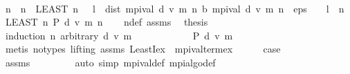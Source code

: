\begin{isabellebody}
%
\isadelimproof
%
\endisadelimproof
%
\isatagproof
{}\isamarkupfalse%
\ {\isacharminus}{\kern0pt}\isanewline
\ \ \isamarkupfalse%
\ n\ \ {\isachardoublequoteopen}n\ {\isacharequal}{\kern0pt}\ {\isacharparenleft}{\kern0pt}LEAST\ n{\isachardot}{\kern0pt}\ {}\ {\isacharasterisk}{\kern0pt}\ l\ {\isacharasterisk}{\kern0pt}\ dist\ {\isacharparenleft}{\kern0pt}mpi{\isacharunderscore}{\kern0pt}val\ d\ v\ m\ n{\isacharparenright}{\kern0pt}\ {\isacharparenleft}{\kern0pt}{\isasymL}\isactrlsub b\ {\isacharparenleft}{\kern0pt}mpi{\isacharunderscore}{\kern0pt}val\ d\ v\ m\ n{\isacharparenright}{\kern0pt}{\isacharparenright}{\kern0pt}\ {\isacharless}{\kern0pt}\ eps\ {\isacharasterisk}{\kern0pt}\ {\isacharparenleft}{\kern0pt}{}\ {\isacharminus}{\kern0pt}\ l{\isacharparenright}{\kern0pt}{\isacharparenright}{\kern0pt}{\isachardoublequoteclose}\ {\isacharparenleft}{\kern0pt}\ {\isachardoublequoteopen}n\ {\isacharequal}{\kern0pt}\ {\isacharparenleft}{\kern0pt}LEAST\ n{\isachardot}{\kern0pt}\ {\isacharquery}{\kern0pt}P\ d\ v\ m\ n{\isacharparenright}{\kern0pt}{\isachardoublequoteclose}{\isacharparenright}{\kern0pt}\isanewline
\ \ \isamarkupfalse%
\ n{\isacharunderscore}{\kern0pt}def\ assms\ \isamarkupfalse%
\ {\isacharquery}{\kern0pt}thesis\isanewline
\ \ \isamarkupfalse%
\ {\isacharparenleft}{\kern0pt}induction\ n\ arbitrary{\isacharcolon}{\kern0pt}\ d\ v\ m{\isacharparenright}{\kern0pt}\isanewline
\ \ \ \ \isamarkupfalse%
\ {}\isanewline
\ \ \ \ \isamarkupfalse%
\ {\isachardoublequoteopen}{\isacharquery}{\kern0pt}P\ d\ v\ m\ {}{\isachardoublequoteclose}\isanewline
\ \ \ \ \ \ \isamarkupfalse%
\ {\isacharparenleft}{\kern0pt}metis\ {\isacharparenleft}{\kern0pt}no{\isacharunderscore}{\kern0pt}types{\isacharcomma}{\kern0pt}\ lifting{\isacharparenright}{\kern0pt}\ assms{\isacharparenleft}{\kern0pt}{}{\isacharparenright}{\kern0pt}\ LeastI{\isacharunderscore}{\kern0pt}ex\ {}\ mpi{\isacharunderscore}{\kern0pt}val{\isacharunderscore}{\kern0pt}term{\isacharunderscore}{\kern0pt}ex{\isacharparenright}{\kern0pt}\isanewline
\ \ \ \ \isamarkupfalse%
\ {\isacharquery}{\kern0pt}case\isanewline
\ \ \ \ \ \ \isamarkupfalse%
\ assms\ {}\isanewline
\ \ \ \ \ \ \isamarkupfalse%
\ {\isacharparenleft}{\kern0pt}auto\ simp{\isacharcolon}{\kern0pt}\ mpi{\isacharunderscore}{\kern0pt}val{\isacharunderscore}{\kern0pt}def\ mpi{\isacharunderscore}{\kern0pt}algo{\isacharunderscore}{\kern0pt}def{\isacharprime}{\kern0pt}{\isacharparenright}{\kern0pt}\isanewline

\end{isabellebody}
